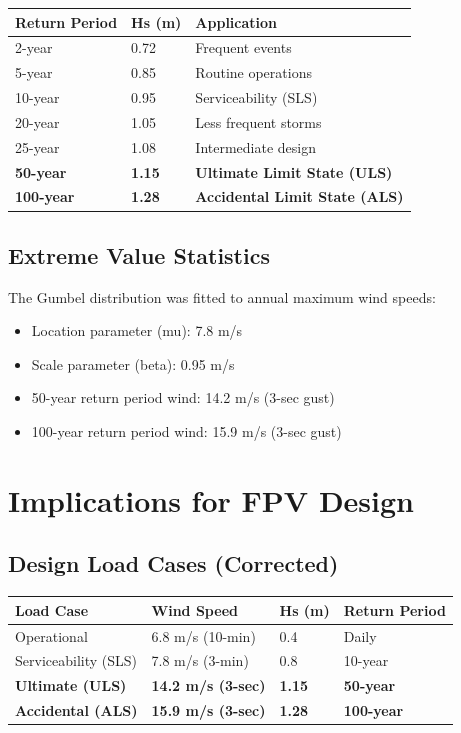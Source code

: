 \documentclass[12pt]{article}
\begin{document}
\begin{center}
\begin{tabular}{|l|l|l|}
\hline
\textbf{Return Period} & \textbf{Hs (m)} & \textbf{Application} \\
\hline
2-year & 0.72 & Frequent events \\
5-year & 0.85 & Routine operations \\
10-year & 0.95 & Serviceability (SLS) \\
20-year & 1.05 & Less frequent storms \\
25-year & 1.08 & Intermediate design \\
\textbf{50-year} & \textbf{1.15} & \textbf{Ultimate Limit State (ULS)} \\
\textbf{100-year} & \textbf{1.28} & \textbf{Accidental Limit State (ALS)} \\
\hline
\end{tabular}
\end{center}

\subsection{Extreme Value Statistics}

The Gumbel distribution was fitted to annual maximum wind speeds:

\begin{itemize}
    \item Location parameter (mu): 7.8 m/s
    \item Scale parameter (beta): 0.95 m/s
    \item 50-year return period wind: 14.2 m/s (3-sec gust)
    \item 100-year return period wind: 15.9 m/s (3-sec gust)
\end{itemize}

\newpage

\section{Implications for FPV Design}

\subsection{Design Load Cases (Corrected)}

\begin{center}
\begin{tabular}{|l|l|l|l|}
\hline
\textbf{Load Case} & \textbf{Wind Speed} & \textbf{Hs (m)} & \textbf{Return Period} \\
\hline
Operational & 6.8 m/s (10-min) & 0.4 & Daily \\
Serviceability (SLS) & 7.8 m/s (3-min) & 0.8 & 10-year \\
\textbf{Ultimate (ULS)} & \textbf{14.2 m/s (3-sec)} & \textbf{1.15} & \textbf{50-year} \\
\textbf{Accidental (ALS)} & \textbf{15.9 m/s (3-sec)} & \textbf{1.28} & \textbf{100-year} \\
\hline
\end{tabular}
\end{center}
\end{document}
